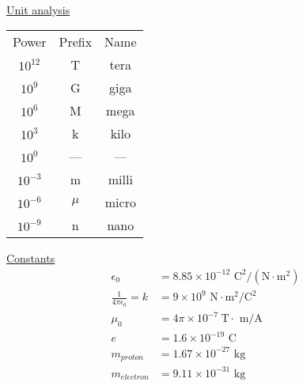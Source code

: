 \thispagestyle{empty}
\newcommand{\degrees}{$^\circ$}
\gdef\kmag{\dfrac{\mu_0}{4 \pi}}
\setlength{\parindent}{12pt}

\begin{center}
	\\
\end{center}
\begin{multicols}{2}
	\begin{minipage}{\columnwidth}
		\centering\underline{Unit analysis}\\
		\begin{tabular}{c c c}
			Power & Prefix & Name\\
			$10^{12}$ & T & tera\\
			$10^9$ & G & giga\\
			$10^6$ & M & mega\\
			$10^3$ & k & kilo\\
			$10^0$ & --- & ---\\
			$10^{-3}$ & m & milli\\
			$10^{-6}$ & $\mu$ & micro\\
			$10^{-9}$ & n & nano
		\end{tabular}
	\end{minipage}
	
	\vspace{12pt}
	\begin{minipage}{\columnwidth}
		\centering\underline{Constants}
		\begin{align*}
			\epsilon_0 &= 8.85\times 10^{-12} \text{ C}^2/ \left(\text{N}\cdot\text{m}^2\right)\\
			\frac{1}{4\pi\epsilon_0} = k&=9\times 10^9 \text{ N}\cdot \text{m}^2/\text{C}^2\\
			\mu_0&=4 \pi \times 10^{-7} \ \text{T} \cdot \text{ m/A}\\
			e&=1.6\times 10^{-19} \text{ C}\\
			m_{proton}&=1.67\times 10^{-27}\text{ kg}\\
			m_{electron}&=9.11\times 10^{-31}\text{ kg}\\
		\end{align*}
	\end{minipage}
	

\end{multicols}

